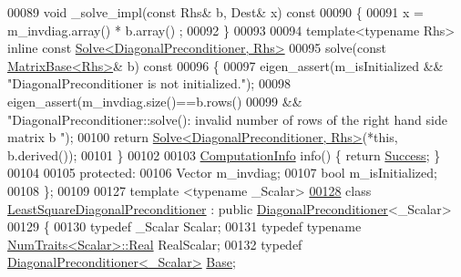 \begin{DoxyCode}
00089     \textcolor{keywordtype}{void} \_solve\_impl(\textcolor{keyword}{const} Rhs& b, Dest& x)\textcolor{keyword}{ const}
00090 \textcolor{keyword}{    }\{
00091       x = m\_invdiag.array() * b.array() ;
00092     \}
00093 
00094     \textcolor{keyword}{template}<\textcolor{keyword}{typename} Rhs> \textcolor{keyword}{inline} \textcolor{keyword}{const} \hyperlink{group___core___module_class_eigen_1_1_solve}{Solve<DiagonalPreconditioner, Rhs>}
00095     solve(\textcolor{keyword}{const} \hyperlink{group___core___module_class_eigen_1_1_matrix_base}{MatrixBase<Rhs>}& b)\textcolor{keyword}{ const}
00096 \textcolor{keyword}{    }\{
00097       eigen\_assert(m\_isInitialized && \textcolor{stringliteral}{"DiagonalPreconditioner is not initialized."});
00098       eigen\_assert(m\_invdiag.size()==b.rows()
00099                 && \textcolor{stringliteral}{"DiagonalPreconditioner::solve(): invalid number of rows of the right hand side matrix b
      "});
00100       \textcolor{keywordflow}{return} \hyperlink{group___core___module_class_eigen_1_1_solve}{Solve<DiagonalPreconditioner, Rhs>}(*\textcolor{keyword}{this}, b.derived());
00101     \}
00102     
00103     \hyperlink{group__enums_ga85fad7b87587764e5cf6b513a9e0ee5e}{ComputationInfo} info() \{ \textcolor{keywordflow}{return} \hyperlink{group__enums_gga85fad7b87587764e5cf6b513a9e0ee5ea52581b035f4b59c203b8ff999ef5fcea}{Success}; \}
00104 
00105   \textcolor{keyword}{protected}:
00106     Vector m\_invdiag;
00107     \textcolor{keywordtype}{bool} m\_isInitialized;
00108 \};
00109 
00127 \textcolor{keyword}{template} <\textcolor{keyword}{typename} \_Scalar>
\hyperlink{group___iterative_linear_solvers___module}{00128} \textcolor{keyword}{class }\hyperlink{group___iterative_linear_solvers___module_class_eigen_1_1_least_square_diagonal_preconditioner}{LeastSquareDiagonalPreconditioner} : \textcolor{keyword}{public} 
      \hyperlink{group___iterative_linear_solvers___module_class_eigen_1_1_diagonal_preconditioner}{DiagonalPreconditioner}<\_Scalar>
00129 \{
00130     \textcolor{keyword}{typedef} \_Scalar Scalar;
00131     \textcolor{keyword}{typedef} \textcolor{keyword}{typename} \hyperlink{group___core___module_struct_eigen_1_1_num_traits}{NumTraits<Scalar>::Real} RealScalar;
00132     \textcolor{keyword}{typedef} \hyperlink{group___iterative_linear_solvers___module_class_eigen_1_1_diagonal_preconditioner}{DiagonalPreconditioner<\_Scalar>} \hyperlink{group___iterative_linear_solvers___module_class_eigen_1_1_diagonal_preconditioner}{Base};

\end{DoxyCode}
